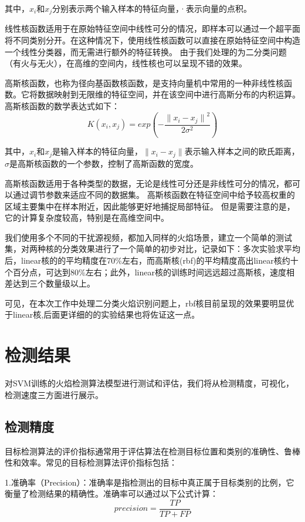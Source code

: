 其中，$x_i$和$x_j$分别表示两个输入样本的特征向量，·表示向量的点积。

线性核函数适用于在原始特征空间中线性可分的情况，即样本可以通过一个超平面将不同类别分开。在这种情况下，使用线性核函数可以直接在原始特征空间中构造一个线性分类器，而无需进行额外的特征转换。
由于我们处理的为二分类问题（有火与无火），在高维的空间内，线性核也可以呈现不错的效果。

高斯核函数，也称为径向基函数核函数，是支持向量机中常用的一种非线性核函数。它将数据映射到无限维的特征空间，并在该空间中进行高斯分布的内积运算。
高斯核函数的数学表达式如下：
\begin{equation} 
    K(x_i,x_j)=exp(-\frac{{\lVert x_i-x_j \rVert}^2}{2\sigma^2})
\end{equation}

其中，$x_i$和$x_j$是输入样本的特征向量，$\lVert x_i-x_j \rVert$表示输入样本之间的欧氏距离，$\sigma$是高斯核函数的一个参数，控制了高斯函数的宽度。

高斯核函数适用于各种类型的数据，无论是线性可分还是非线性可分的情况，都可以通过调节参数来适应不同的数据集。
高斯核函数在特征空间中给予较高权重的区域主要集中在样本附近，因此能够更好地捕捉局部特征。
但是需要注意的是，它的计算复杂度较高，特别是在高维空间中。

我们使用多个不同的干扰源视频，都加入同样的火焰场景，建立一个简单的测试集，对两种核的分类效果进行了一个简单的初步对比，记录如下：多次实验求平均后，linear核的的平均精度在70\%左右，而高斯核(rbf)的平均精度高出linear核约十个百分点，可达到80\%左右；此外，linear核的训练时间远远超过高斯核，速度相差达到三个数量级以上。

可见，在本次工作中处理二分类火焰识别问题上，rbf核目前呈现的效果要明显优于linear核,后面更详细的的实验结果也将佐证这一点。
\section{检测结果}
对SVM训练的火焰检测算法模型进行测试和评估，我们将从检测精度，可视化，检测速度三方面进行展示。
\subsection{检测精度}
目标检测算法的评价指标通常用于评估算法在检测目标位置和类别的准确性、鲁棒性和效率。常见的目标检测算法评价指标包括：

1.准确率（Precision）：准确率是指检测出的目标中真正属于目标类别的比例，它衡量了检测结果的精确性。准确率可以通过以下公式计算：
\begin{equation} 
    precision=\frac{TP}{TP+FP}
\end{equation}

